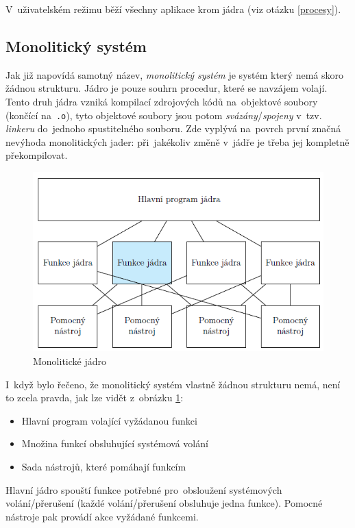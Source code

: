 V~uživatelském režimu běží všechny aplikace krom jádra (viz otázku \ref{procesy}).

\subsection{Monolitický systém}

Jak již napovídá samotný název, \emph{monolitický systém} je systém který nemá skoro žádnou strukturu. Jádro je pouze souhrn procedur, které se navzájem volají. Tento druh jádra vzniká kompilací zdrojových kódů na~objektové soubory (končící na~\texttt{.o}), tyto objektové soubory jsou potom \emph{svázány}/\emph{spojeny} v~tzv. \emph{linkeru} do~jednoho spustitelného souboru. Zde vyplývá na~povrch první značná nevýhoda monolitických jader: při~jakékoliv změně v~jádře je třeba jej kompletně překompilovat.

\begin{figure}[ht]
	\centering
	\includegraphics[scale=1]{images/OS_mono_kernel.png}
	\caption{Monolitické jádro}
	\label{OS_mono_kernel}
\end{figure}

I~když bylo řečeno, že monolitický systém vlastně žádnou strukturu nemá, není to zcela pravda, jak lze vidět z~obrázku \ref{OS_mono_kernel}:

\begin{itemize}[noitemsep]
	\item Hlavní program volající vyžádanou funkci
	\item Množina funkcí obsluhující systémová volání
	\item Sada nástrojů, které pomáhají funkcím
\end{itemize}

Hlavní jádro spouští funkce potřebné pro~obsloužení systémových volání/přerušení (každé volání/přerušení obsluhuje jedna funkce). Pomocné nástroje pak provádí akce vyžádané funkcemi.

